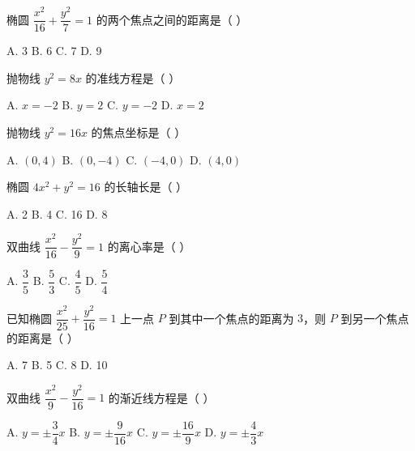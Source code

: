 \documentclass[11pt, a4paper]{article}
\begin{document}
\begin{baitap}[14]
椭圆 $\dfrac{x^2}{16} + \dfrac{y^2}{7} = 1$ 的两个焦点之间的距离是（ ）
\par\vspace{3pt}
\noindent A. 3 \quad B. 6 \quad C. 7 \quad D. 9
\end{baitap}

\begin{baitap}[15]
抛物线 $y^2 = 8x$ 的准线方程是（ ）
\par\vspace{3pt}
\noindent A. $x = -2$ \quad B. $y = 2$ \quad C. $y = -2$ \quad D. $x = 2$
\end{baitap}

\begin{baitap}[16]
抛物线 $y^2 = 16x$ 的焦点坐标是（ ）
\par\vspace{3pt}
\noindent A. $(0,4)$ \quad B. $(0,-4)$ \quad C. $(-4,0)$ \quad D. $(4,0)$
\end{baitap}

\begin{baitap}[17]
椭圆 $4x^2 + y^2 = 16$ 的长轴长是（ ）
\par\vspace{3pt}
\noindent A. 2 \quad B. 4 \quad C. 16 \quad D. 8
\end{baitap}

\begin{baitap}[18]
双曲线 $\dfrac{x^2}{16} - \dfrac{y^2}{9} = 1$ 的离心率是（ ）
\par\vspace{3pt}
\noindent A. $\dfrac{3}{5}$ \quad B. $\dfrac{5}{3}$ \quad C. $\dfrac{4}{5}$ \quad D. $\dfrac{5}{4}$
\end{baitap}

\begin{baitap}[19]
已知椭圆 $\dfrac{x^2}{25} + \dfrac{y^2}{16} = 1$ 上一点 $P$ 到其中一个焦点的距离为 $3$，则 $P$ 到另一个焦点的距离是（ ）
\par\vspace{3pt}
\noindent A. 7 \quad B. 5 \quad C. 8 \quad D. 10
\end{baitap}

\begin{baitap}[20]
双曲线 $\dfrac{x^2}{9} - \dfrac{y^2}{16} = 1$ 的渐近线方程是（ ）
\par\vspace{3pt}
\noindent A. $y = \pm\dfrac{3}{4}x$ \quad B. $y = \pm\dfrac{9}{16}x$ \quad C. $y = \pm\dfrac{16}{9}x$ \quad D. $y = \pm\dfrac{4}{3}x$
\end{baitap}
\end{document}
